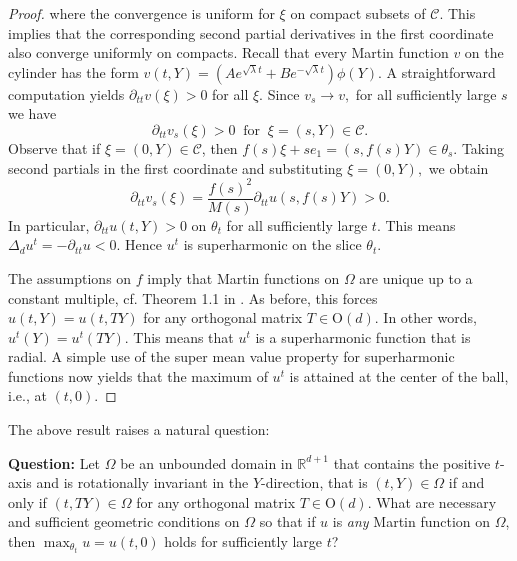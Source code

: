 \documentclass[11pt]{amsart}
\theoremstyle{definition}
\theoremstyle{remark}
\begin{document}
\begin{proof}
where the convergence is uniform for $\xi$ on compact subsets of $\mathcal{C}$. This implies that the corresponding second partial derivatives in the first coordinate also converge uniformly on compacts. Recall that every Martin function $v$ on the cylinder has the form $v(t, Y) = (Ae^{\sqrt{\lambda}t} + Be^{-\sqrt{\lambda}t})\phi(Y).$ %
A straightforward computation yields $\partial_{tt}v(\xi) > 0$
for all $\xi$. Since $v_s\to v,$ for all sufficiently large $s$ we have
$$\partial_{tt}v_s(\xi) >0\;\;\text{for}\;\;\xi = (s, Y)\in\mathcal{C}.$$
Observe that if  $\xi = (0,Y)\in\mathcal{C}$,  then $f(s)\xi + se_1 = (s, f(s)Y) \in\theta_s$. Taking second partials in the first coordinate and substituting $\xi=(0,Y),$ we obtain $$\partial_{tt}v_s(\xi) = \dfrac{f(s)^2}{M(s)}\partial_{tt}u(s,f(s)Y) > 0.$$ In particular, $\partial_{tt}u(t, Y) > 0 $ on $\theta_t$ for all sufficiently large $t$. This means $\Delta_{d}u^t = - \partial_{tt}u < 0.$ Hence $u^t$ is superharmonic on the slice $\theta_t$. 

\vspace{0.1in}

\noindent The assumptions on $f$ imply that Martin functions on $\Omega$ are unique up to a constant multiple, cf. Theorem 1.1  in \cite{DeB}. As before, this forces $u(t, Y) = u(t, TY)$ for any orthogonal matrix $T\in \text{O}(d).$ In other words, $u^t(Y) = u^t(TY)$. This means that $u^t$ is a superharmonic function that is radial. A simple use of the super mean value property for superharmonic functions now yields that the maximum of $u^t$ is attained at the center of the ball, i.e., at $(t,0)$. 
\end{proof}

\noindent The above result raises a natural question: 

\vspace{0.1in} 

\noindent \textbf{Question:} Let $\Omega$ be an unbounded domain in $\mathbb{R}^{d+1}$ that contains the positive $t$-axis and is rotationally invariant in the $Y$-direction, that is $(t, Y)\in\Omega$ if and only if $(t, TY)\in\Omega$ for any orthogonal matrix $T\in \text{O}(d)$. What are necessary and sufficient geometric conditions on $\Omega$ so that if $u$ is \emph{any} Martin function on $\Omega$, then $\max_{\theta_t}u = u(t,0)$ holds for sufficiently large $t$?

\vspace{0.1in}
\end{document}
